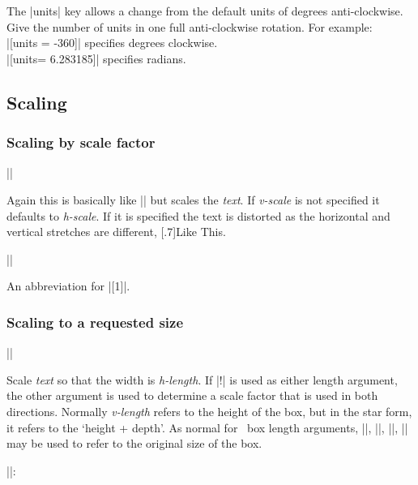 The |units| key allows a change from the default units of degrees
anti-clockwise. Give the number of units in one full anti-clockwise
rotation. For example:\\
|[units = -360]| specifies degrees clockwise.\\
|[units= 6.283185]| specifies radians.

\subsection{Scaling}

\subsubsection{Scaling by scale factor}

\begin{decl}
|\scalebox|
\end{decl}

Again this is basically like |\mbox| but scales the \emph{text}.
If \emph{v-scale} is not specified it defaults to \emph{h-scale}.
If it is specified the text is distorted as the horizontal and
vertical stretches are different, \scalebox{3}[.7]{Like This}.


\begin{decl}
||
\end{decl}

An abbreviation for |\scalebox{-1}[1]|.

\subsubsection{Scaling to a requested size}

\begin{decl}
|\resizebox|\star{}
\end{decl}

 Scale \emph{text} so that the width is \emph{h-length}.
 If |!| is used as either length argument, the other argument is used
 to determine a scale factor that is used in both directions.
 Normally \emph{v-length} refers to the height of the box, but in the
 star form, it refers to the `height +  depth'.
 As normal for \LaTeXe\ box length arguments, |\height|,
 |\width|, |\totalheight|, |\depth| may be used to refer to the
 original size of the box.

||:


